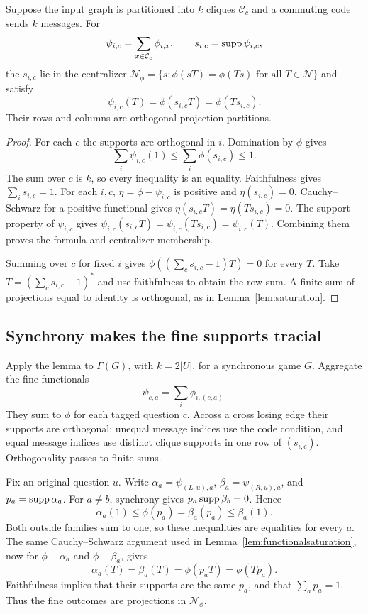 \begin{lemma}\label{lem:functionalsaturation}
Suppose the input graph is partitioned into $k$ cliques $\mathcal C_c$ and a commuting code sends $k$ messages. For
\[
 \psi_{i,c}=\sum_{x\in \mathcal C_c}\phi_{i,x},\qquad s_{i,c}=\operatorname{supp}\psi_{i,c},
\]
the $s_{i,c}$ lie in the centralizer
$\mathcal N_\phi=\{s:\phi(sT)=\phi(Ts)\text{ for all }T\in\mathcal N\}$ and satisfy
\[
 \psi_{i,c}(T)=\phi(s_{i,c}T)=\phi(Ts_{i,c}).
\]
Their rows and columns are orthogonal projection partitions.
\end{lemma}
\begin{proof}
For each $c$ the supports are orthogonal in $i$. Domination by $\phi$ gives
\[
 \sum_i\psi_{i,c}(1)\leq\sum_i\phi(s_{i,c})\leq1.
\]
The sum over $c$ is $k$, so every inequality is an equality. Faithfulness gives $\sum_i s_{i,c}=1$. For each $i,c$, $\eta=\phi-\psi_{i,c}$ is positive and $\eta(s_{i,c})=0$. Cauchy--Schwarz for a positive functional gives $\eta(s_{i,c}T)=\eta(Ts_{i,c})=0$. The support property of $\psi_{i,c}$ gives $\psi_{i,c}(s_{i,c}T)=\psi_{i,c}(Ts_{i,c})=\psi_{i,c}(T)$. Combining them proves the formula and centralizer membership.

Summing over $c$ for fixed $i$ gives $\phi((\sum_c s_{i,c}-1)T)=0$ for every $T$. Take $T=(\sum_c s_{i,c}-1)^*$ and use faithfulness to obtain the row sum. A finite sum of projections equal to identity is orthogonal, as in Lemma~\ref{lem:saturation}.
\end{proof}

\subsection{Synchrony makes the fine supports tracial}
Apply the lemma to $\Gamma(G)$, with $k=2|U|$, for a synchronous game $G$. Aggregate the fine functionals
\[
 \psi_{c,a}=\sum_i\phi_{i,(c,a)}.
\]
They sum to $\phi$ for each tagged question $c$. Across a cross losing edge their supports are orthogonal: unequal message indices use the code condition, and equal message indices use distinct clique supports in one row of $(s_{i,c})$. Orthogonality passes to finite sums.

Fix an original question $u$. Write $\alpha_a=\psi_{(L,u),a}$, $\beta_a=\psi_{(R,u),a}$, and $p_a=\operatorname{supp}\alpha_a$. For $a\ne b$, synchrony gives $p_a\operatorname{supp}\beta_b=0$. Hence
\[
 \alpha_a(1)\leq\phi(p_a)=\beta_a(p_a)\leq\beta_a(1).
\]
Both outside families sum to one, so these inequalities are equalities for every $a$. The same Cauchy--Schwarz argument used in Lemma~\ref{lem:functionalsaturation}, now for $\phi-\alpha_a$ and $\phi-\beta_a$, gives
\[
 \alpha_a(T)=\beta_a(T)=\phi(p_aT)=\phi(Tp_a).
\]
Faithfulness implies that their supports are the same $p_a$, and that $\sum_a p_a=1$. Thus the fine outcomes are projections in $\mathcal N_\phi$.

